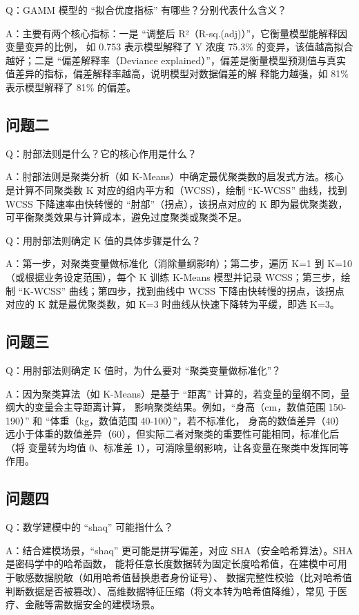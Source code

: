 \documentclass{article}
\begin{document}
Q：GAMM 模型的 “拟合优度指标” 有哪些？分别代表什么含义？

A：主要有两个核心指标：一是 “调整后 R²（R-sq.(adj)）”，它衡量模型能解释因变量变异的比例，
如 0.753 表示模型解释了 Y 浓度 75.3\% 的变异，该值越高拟合越好；二是 “偏差解释率（Deviance
explained）”，偏差是衡量模型预测值与真实值差异的指标，偏差解释率越高，说明模型对数据偏差的解
释能力越强，如 81\% 表示模型解释了 81\% 的偏差。

\subsection{问题二}
Q：肘部法则是什么？它的核心作用是什么？

A：肘部法则是聚类分析（如 K-Means）中确定最优聚类数的启发式方法。核心是计算不同聚类数 K 对应的组内平方和（WCSS），绘制 “K-WCSS” 曲线，找到 WCSS 下降速率由快转慢的 “肘部”（拐点），该拐点对应的 K 即为最优聚类数，可平衡聚类效果与计算成本，避免过度聚类或聚类不足。

Q：用肘部法则确定 K 值的具体步骤是什么？

A：第一步，对聚类变量做标准化（消除量纲影响）；第二步，遍历 K=1 到 K=10（或根据业务设定范围），每个 K 训练 K-Means 模型并记录 WCSS；第三步，绘制 “K-WCSS” 曲线；第四步，找到曲线中 WCSS 下降由快转慢的拐点，该拐点对应的 K 就是最优聚类数，如 K=3 时曲线从快速下降转为平缓，即选 K=3。
\subsection{问题三}
Q：用肘部法则确定 K 值时，为什么要对 “聚类变量做标准化”？

A：因为聚类算法（如 K-Means）是基于 “距离” 计算的，若变量的量纲不同，量纲大的变量会主导距离计算，
影响聚类结果。例如，“身高（cm，数值范围 150-190）” 和 “体重（kg，数值范围 40-100）”，若不标准化，
身高的数值差异（40）远小于体重的数值差异（60），但实际二者对聚类的重要性可能相同，标准化后（将
变量转为均值 0、标准差 1），可消除量纲影响，让各变量在聚类中发挥同等作用。
\subsection{问题四}
Q：数学建模中的 “shaq” 可能指什么？

A：结合建模场景，“shaq” 更可能是拼写偏差，对应 SHA（安全哈希算法）。SHA 是密码学中的哈希函数，
能将任意长度数据转为固定长度哈希值，在建模中可用于敏感数据脱敏（如用哈希值替换患者身份证号）、
数据完整性校验（比对哈希值判断数据是否被篡改）、高维数据特征压缩（将文本转为哈希值降维），常见
于医疗、金融等需数据安全的建模场景。
\end{document}
